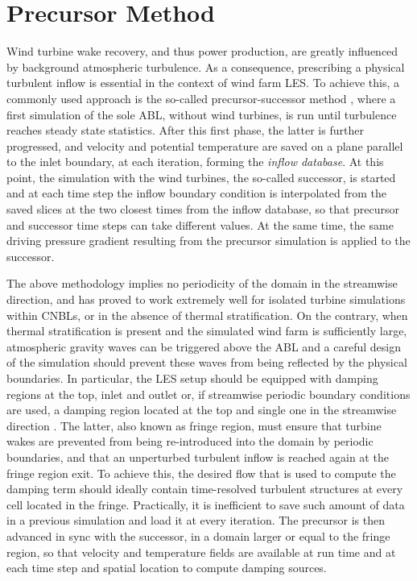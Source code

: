 \section{Precursor Method}
\label{sec:precursorMethod}
Wind turbine wake recovery, and thus power production, are greatly influenced by background atmospheric turbulence. As a consequence, prescribing a physical turbulent inflow is essential in the context of wind farm LES. To achieve this, a commonly used approach is the so-called precursor-successor method \citep{ChurchfieldEtAl2012a,ChurchfieldEtAl2012b}, where a first simulation of the sole ABL, without wind turbines, is run until turbulence reaches steady state statistics. After this first phase, the latter is further progressed, and velocity and potential temperature are saved on a plane parallel to the inlet boundary, at each iteration, forming the \textit{inflow database}. At this point, the simulation with the wind turbines, the so-called successor, is started and at each time step the inflow boundary condition is interpolated from the saved slices at the two closest times from the inflow database, so that precursor and successor time steps can take different values. At the same time, the same driving pressure gradient resulting from the precursor simulation is applied to the successor.

The above methodology implies no periodicity of the domain in the streamwise direction, and has proved to work extremely well for isolated turbine simulations within CNBLs, or in the absence of thermal stratification. On the contrary, when thermal stratification is present and the simulated wind farm is sufficiently large, atmospheric gravity waves can be triggered above the ABL and a careful design of the simulation should prevent these waves from being reflected by the physical boundaries. In particular, the LES setup should be equipped with damping regions at the top, inlet and outlet or, if streamwise periodic boundary conditions are used, a damping region located at the top and single one in the streamwise direction \citep{CalafEtAl2010,InoueEtAl2014,AllaertsMayers2017a}. The latter, also known as fringe region, must ensure that turbine wakes are prevented from being re-introduced into the domain by periodic boundaries, and that an unperturbed turbulent inflow is reached again at the fringe region exit. To achieve this, the desired flow that is used to compute the damping term should ideally contain time-resolved turbulent structures at every cell located in the fringe. Practically, it is inefficient to save such amount of data in a previous simulation and load it at every iteration. 
The precursor is then advanced in sync with the successor, in a domain larger or equal to the fringe region, so that velocity and temperature fields are available at run time and at each time step and spatial location to compute damping sources. 

